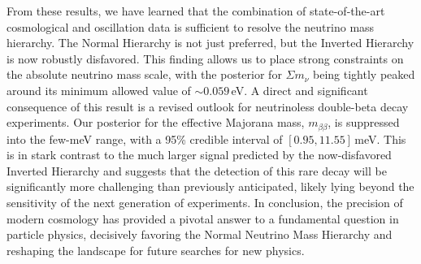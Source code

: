 \documentclass[]{article}
\begin{document}
From these results, we have learned that the combination of state-of-the-art cosmological and oscillation data is sufficient to resolve the neutrino mass hierarchy. The Normal Hierarchy is not just preferred, but the Inverted Hierarchy is now robustly disfavored. This finding allows us to place strong constraints on the absolute neutrino mass scale, with the posterior for $\Sigma m_\nu$ being tightly peaked around its minimum allowed value of $\sim 0.059$\,eV. A direct and significant consequence of this result is a revised outlook for neutrinoless double-beta decay experiments. Our posterior for the effective Majorana mass, $m_{\beta\beta}$, is suppressed into the few-meV range, with a 95\% credible interval of $[0.95, 11.55]$\,meV. This is in stark contrast to the much larger signal predicted by the now-disfavored Inverted Hierarchy and suggests that the detection of this rare decay will be significantly more challenging than previously anticipated, likely lying beyond the sensitivity of the next generation of experiments. In conclusion, the precision of modern cosmology has provided a pivotal answer to a fundamental question in particle physics, decisively favoring the Normal Neutrino Mass Hierarchy and reshaping the landscape for future searches for new physics.
\end{document}
